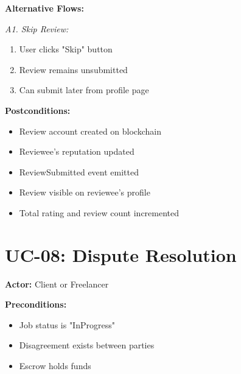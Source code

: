\documentclass[a4paper,13pt,twoside]{report}
\theoremstyle{definition}
\begin{document}
\textbf{Alternative Flows:}

\textit{A1. Skip Review:}
\begin{enumerate}
    \item User clicks "Skip" button
    \item Review remains unsubmitted
    \item Can submit later from profile page
\end{enumerate}

\textbf{Postconditions:}
\begin{itemize}
    \item Review account created on blockchain
    \item Reviewee's reputation updated
    \item ReviewSubmitted event emitted
    \item Review visible on reviewee's profile
    \item Total rating and review count incremented
\end{itemize}

\section{UC-08: Dispute Resolution}

\textbf{Actor:} Client or Freelancer

\textbf{Preconditions:}
\begin{itemize}
    \item Job status is "InProgress"
    \item Disagreement exists between parties
    \item Escrow holds funds
\end{itemize}
\end{document}
